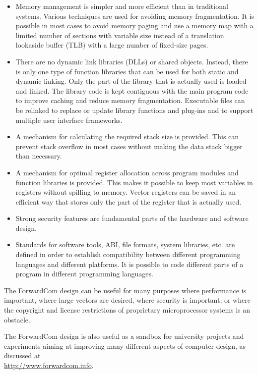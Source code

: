 \documentclass[forwardcom.tex]{subfiles}
\begin{document}
\begin{itemize}
\item Memory management is simpler and more efficient than in traditional systems. Various techniques are used for avoiding memory fragmentation. 
It is possible in most cases to avoid memory paging and use a memory map with a limited number of sections with variable size instead of a translation lookaside buffer (TLB) with a large number of fixed-size pages.

\item There are no dynamic link libraries (DLLs) or shared objects. Instead, there is only one type of function libraries 
that can be used for both static and dynamic linking. Only the part of the library that is actually used is loaded and linked. The library code is kept contiguous with the main program code to improve caching and reduce memory fragmentation. 
Executable files can be relinked to replace or update library functions and plug-ins and to support multiple user interface frameworks.

\item A mechanism for calculating the required stack size is provided. This can prevent stack overflow in most cases without making the data stack bigger than necessary.

\item A mechanism for optimal register allocation across program modules and function libraries is provided. This makes it possible to keep most variables in registers without spilling to memory. Vector registers can be saved in an efficient way that stores only the part of the register that is actually used.

\item Strong security features are fundamental parts of the hardware and software design.

\item Standards for software tools, ABI, file formats, system libraries, etc. are defined in order to establish compatibility between different programming languages and different platforms. It is possible to code different parts of a program in different programming languages.

\end{itemize}
\vv

The ForwardCom design can be useful for many purposes where performance is important, where large vectors are desired, where security is important, or where the copyright and license restrictions of proprietary microprocessor systems is an obstacle. 

\vv
The ForwardCom design is also useful as a sandbox for university projects and experiments aiming at improving many different aspects of computer design, as discussed at \\
\href{http://www.forwardcom.info}{http://www.forwardcom.info}.
\end{document}
